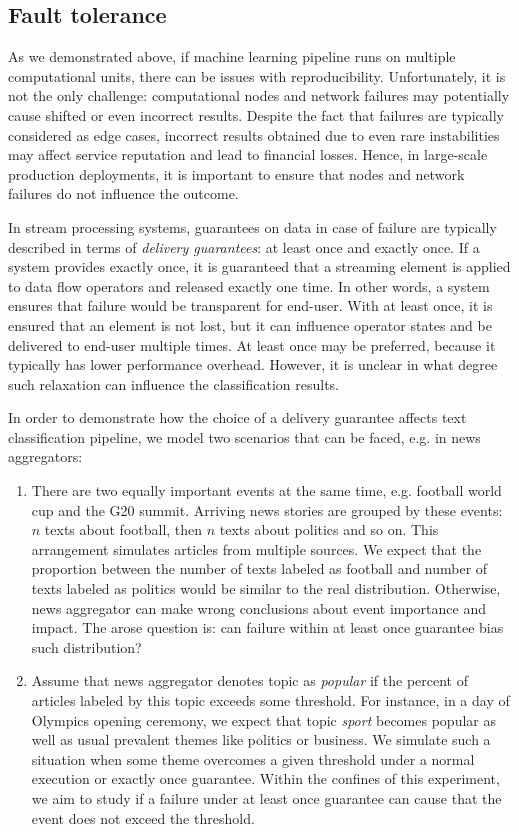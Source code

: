 \subsection{Fault tolerance}

As we demonstrated above, if machine learning pipeline runs on multiple computational units, there can be issues with reproducibility. Unfortunately, it is not the only challenge: computational nodes and network failures may potentially cause shifted or even incorrect results. Despite the fact that failures are typically considered as edge cases, incorrect results obtained due to even rare instabilities may affect service reputation and lead to financial losses. Hence, in large-scale production deployments, it is important to ensure that nodes and network failures do not influence the outcome.

In stream processing systems, guarantees on data in case of failure are typically described in terms of {\em delivery guarantees}: at least once and exactly once. If a system provides exactly once, it is guaranteed that a streaming element is applied to data flow operators and released exactly one time. In other words, a system ensures that failure would be transparent for end-user. With at least once, it is ensured that an element is not lost, but it can influence operator states and be delivered to end-user multiple times. At least once may be preferred, because it typically has lower performance overhead. However, it is unclear in what degree such relaxation can influence the classification results. 

In order to demonstrate how the choice of a delivery guarantee affects text classification pipeline, we model two scenarios that can be faced, e.g. in news aggregators:
\begin{enumerate}
    \item There are two equally important events at the same time, e.g. football world cup and the G20 summit. Arriving news stories are grouped by these events: $n$ texts about football, then $n$ texts about politics and so on. This arrangement simulates articles from multiple sources. We expect that the proportion between the number of texts labeled as football and number of texts labeled as politics would be similar to the real distribution. Otherwise, news aggregator can make wrong conclusions about event importance and impact. The arose question is: can failure within at least once guarantee bias such distribution?
    \item Assume that news aggregator denotes topic as {\em popular} if the percent of articles labeled by this topic exceeds some threshold. For instance, in a day of Olympics opening ceremony, we expect that topic {\em sport} becomes popular as well as usual prevalent themes like politics or business. We simulate such a situation when some theme overcomes a given threshold under a normal execution or exactly once guarantee. Within the confines of this experiment, we aim to study if a failure under at least once guarantee can cause that the event does not exceed the threshold.    
\end{enumerate}

